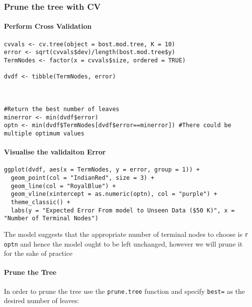 \documentclass[12pt]{article}
\newcommand{\passthrough}[1]{#1}
\begin{document}
\hypertarget{prune-the-tree-with-cv}{%
\subsubsection{Prune the tree with CV}\label{prune-the-tree-with-cv}}

\hypertarget{perform-cross-validation}{%
\paragraph{Perform Cross Validation}\label{perform-cross-validation}}

\begin{lstlisting}
cvvals <- cv.tree(object = bost.mod.tree, K = 10)
error <- sqrt(cvvals$dev)/length(bost.mod.tree$y)
TermNodes <- factor(x = cvvals$size, ordered = TRUE)

dvdf <- tibble(TermNodes, error) 



#Return the best number of leaves
minerror <- min(dvdf$error)
optn <- min(dvdf$TermNodes[dvdf$error==minerror]) #There could be multiple optimum values
\end{lstlisting}

\hypertarget{visualise-the-validaiton-error}{%
\paragraph{Visualise the validaiton
Error}\label{visualise-the-validaiton-error}}

\begin{lstlisting}
ggplot(dvdf, aes(x = TermNodes, y = error, group = 1)) +
  geom_point(col = "IndianRed", size = 3) +
  geom_line(col = "RoyalBlue") +
  geom_vline(xintercept = as.numeric(optn), col = "purple") +
  theme_classic() +
  labs(y = "Expected Error From model to Unseen Data ($50 K)", x = "Number of Terminal Nodes")
\end{lstlisting}

The model suggests that the appropriate number of terminal nodes to
choose is \passthrough{\lstinline!r optn!} and hence the model ought to
be left unchanged, however we will prune it for the sake of practice

\hypertarget{prune-the-tree-1}{%
\paragraph{Prune the Tree}\label{prune-the-tree-1}}

In order to prune the tree use the \passthrough{\lstinline!prune.tree!}
function and specify \passthrough{\lstinline!best=!} as the desired
number of leaves:
\end{document}
